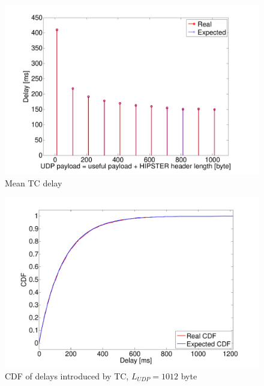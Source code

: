 \documentclass[10pt,twocolumn]{article}
\begin{document}
\begin{figure}[h!]
  \centering
  \includegraphics[width=0.95\columnwidth, keepaspectratio]{tex/images/delayChannel.pdf}
  \caption{Mean TC delay}
  \label{fig:delay}
\end{figure}

\begin{figure}[h!]
  \centering
  \includegraphics[width = 0.95\columnwidth, keepaspectratio]{tex/images/cdfChannel.pdf}
  \caption{CDF of delays introduced by TC, $L_{UDP} = 1012$ byte}
  \label{fig:CDF}
\end{figure}
\end{document}
